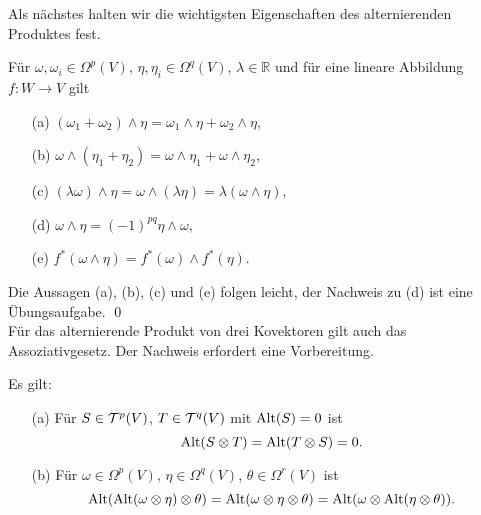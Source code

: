 \documentclass[a4paper,twoside,DIV15,BCOR12mm]{scrbook}
\begin{document}
\noindent Als nächstes halten wir die wichtigsten Eigenschaften des 
alternierenden Produktes fest.\\



\begin{satz}\label{Satz3.3.3} {Für $\omega, \omega_{i} \in 
\Omega^{p}(V)$, $\eta, \eta_{i} \in \Omega^{q}(V)$, $\lambda \in 
{\mathbb R}$ und für eine lineare Abbildung $f: W \to V$ gilt}
\begin{enumerate}
\item[{\rm (a)}] $(\omega_{1} + \omega_{2}) \wedge \eta = \omega_{1} \wedge 
\eta + \omega_{2} \wedge \eta$,
\item[{\rm (b)}] $\omega \wedge (\eta_{1} + \eta_{2}) = \omega \wedge \eta_{1} + 
\omega \wedge \eta_{2}$, 
\item[{\rm (c)}] $(\lambda \omega) \wedge \eta = \omega \wedge (\lambda \eta) = 
\lambda(\omega \wedge \eta)$,
\item[{\rm (d)}] $\omega \wedge \eta = (-1)^{pq} \eta \wedge \omega$,
\item[{\rm (e)}] $f^{*}(\omega \wedge \eta) = f^{*}(\omega) \wedge f^{*}(\eta)$.
\end{enumerate}
\end{satz}

\bigskip

 Die Aussagen (a), (b), (c) und (e) folgen 
leicht, der Nachweis zu (d) ist eine Übungsaufgabe. \qed\\

\noindent
Für das alternierende Produkt von drei Kovektoren gilt auch das 
Assoziativgesetz. Der Nachweis erfordert eine Vorbereitung.

\bigskip

\begin{lemma}\label{Lemma3.3.4} {Es gilt:}
\begin{enumerate}
\item[{\rm (a)}] {Für $S \in {\cal T}^{p}(V)$, $T \in {\cal T}^{q}(V)$ mit 
${\rm Alt}(S) = 0$ ist}
\[ {\rm Alt}(S \otimes T) = {\rm Alt}(T \otimes S) = 0. \]
\item[{\rm (b)}] {Für $\omega \in \Omega^{p}(V)$, $\eta \in \Omega^{q}(V)$, 
$\theta \in \Omega^{r}(V)$ ist}
\[ {\rm Alt}({\rm Alt}(\omega \otimes \eta) \otimes \theta) = {\rm 
Alt}(\omega \otimes \eta \otimes \theta) = {\rm Alt}(\omega \otimes 
{\rm Alt}(\eta \otimes \theta)). \]
\end{enumerate}
\end{lemma}
\end{document}
